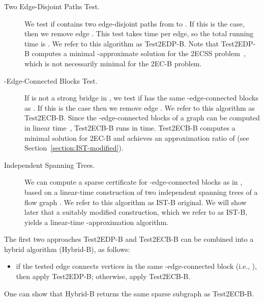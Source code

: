 \documentclass[11pt]{article}
\begin{document}
\begin{description}
  \item[Two Edge-Disjoint Paths Test.]
    We test if  contains two edge-disjoint paths from  to .
    If this is the case, then we remove edge .
    This test takes  time per edge, so the total running time is .
    We refer to this algorithm as \textsf{Test2EDP-B}.
    Note that \textsf{Test2EDP-B} computes a minimal -approximate solution for the \textsf{2ECSS} problem~\cite{CT00}, which is not necessarily minimal for the \textsf{2EC-B} problem.

  \item[-Edge-Connected Blocks Test.]
    If  is not a strong bridge in , we test if  has the same -edge-connected blocks as . If this is the case then we remove edge .
    We refer to this algorithm as \textsf{Test2ECB-B}.
    Since the -edge-connected blocks of a graph can be computed in linear time~\cite{2ECB}, \textsf{Test2ECB-B} runs in  time.
    \textsf{Test2ECB-B} computes a minimal solution for \textsf{2EC-B} and achieves an approximation ratio of  (see Section~\ref{section:IST-modified}).

  \item[Independent Spanning Trees.]
    We can compute a sparse certificate for -edge-connected blocks as in \cite{2ECB}, based on a linear-time construction of two independent spanning trees of a flow graph \cite{domv:gt05,domcert}.
    We refer to this algorithm as \textsf{IST-B original}.
    We will show later that a suitably modified construction, which we refer to as \textsf{IST-B}, yields a linear-time -approximation algorithm.
\end{description}
The first two approaches \textsf{Test2EDP-B} and \textsf{Test2ECB-B} can be combined into a hybrid algorithm (\textsf{Hybrid-B}),  as follows:
\begin{itemize}
\item if the tested edge  connects vertices in the same -edge-connected block
(i.e., ), then apply \textsf{Test2EDP-B}; otherwise, apply  \textsf{Test2ECB-B}.
\end{itemize}
One can show that \textsf{Hybrid-B} returns the same sparse subgraph as \textsf{Test2ECB-B}.
\end{document}
